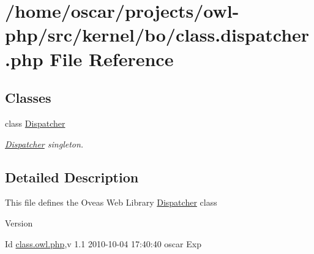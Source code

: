 \section{/home/oscar/projects/owl-\/php/src/kernel/bo/class.dispatcher.php File Reference}
\label{class_8dispatcher_8php}
\subsection*{Classes}
\begin{DoxyCompactItemize}
\item 
class \hyperlink{classDispatcher}{Dispatcher}
\begin{DoxyCompactList}\small\item\em \hyperlink{classDispatcher}{Dispatcher} singleton. \item\end{DoxyCompactList}\end{DoxyCompactItemize}


\subsection{Detailed Description}
This file defines the Oveas Web Library \hyperlink{classDispatcher}{Dispatcher} class \begin{DoxyVersion}{Version}

\end{DoxyVersion}
\begin{DoxyParagraph}{Id}
\hyperlink{class_8owl_8php}{class.owl.php},v 1.1 2010-\/10-\/04 17:40:40 oscar Exp 
\end{DoxyParagraph}
